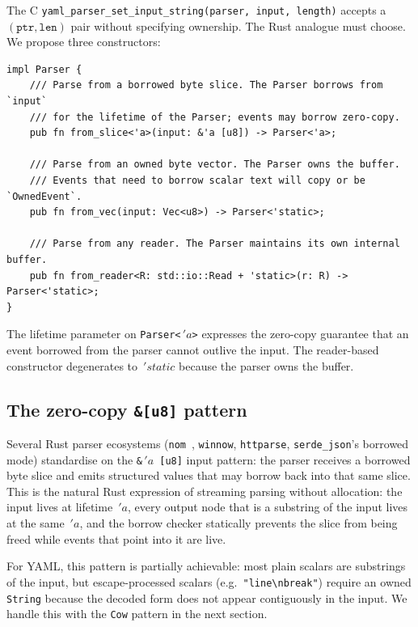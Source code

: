 \documentclass[12pt]{article}
\theoremstyle{definition}
\theoremstyle{remark}
\newcommand{\lifetime}[1]{\ensuremath{\,'\!#1}}
\begin{document}
The C \texttt{yaml\_parser\_set\_input\_string(parser, input, length)} accepts
a $(\texttt{ptr},\texttt{len})$ pair without specifying ownership. The Rust
analogue must choose. We propose three constructors:

\begin{lstlisting}
impl Parser {
    /// Parse from a borrowed byte slice. The Parser borrows from `input`
    /// for the lifetime of the Parser; events may borrow zero-copy.
    pub fn from_slice<'a>(input: &'a [u8]) -> Parser<'a>;

    /// Parse from an owned byte vector. The Parser owns the buffer.
    /// Events that need to borrow scalar text will copy or be `OwnedEvent`.
    pub fn from_vec(input: Vec<u8>) -> Parser<'static>;

    /// Parse from any reader. The Parser maintains its own internal buffer.
    pub fn from_reader<R: std::io::Read + 'static>(r: R) -> Parser<'static>;
}
\end{lstlisting}

The lifetime parameter on \texttt{Parser<\lifetime{a}>} expresses the
zero-copy guarantee that an event borrowed from the parser cannot outlive the
input. The reader-based constructor degenerates to $\lifetime{static}$ because
the parser owns the buffer.

\subsection{The zero-copy \texttt{\&[u8]} pattern}

Several Rust parser ecosystems (\texttt{nom}~\cite{nom}, \texttt{winnow},
\texttt{httparse}, \texttt{serde\_json}'s borrowed mode) standardise on the
\texttt{\&\lifetime{a}\,[u8]} input pattern: the parser receives a borrowed
byte slice and emits structured values that may borrow back into that same
slice. This is the natural Rust expression of streaming parsing without
allocation: the input lives at lifetime $\lifetime{a}$, every output node
that is a substring of the input lives at the same $\lifetime{a}$, and
the borrow checker statically prevents the slice from being freed while
events that point into it are live.

For YAML, this pattern is partially achievable: most plain scalars are
substrings of the input, but escape-processed scalars (e.g.\
\verb|"line\nbreak"|) require an owned \texttt{String}
because the decoded form does not appear contiguously in the input. We
handle this with the \texttt{Cow} pattern in the next section.
\end{document}

